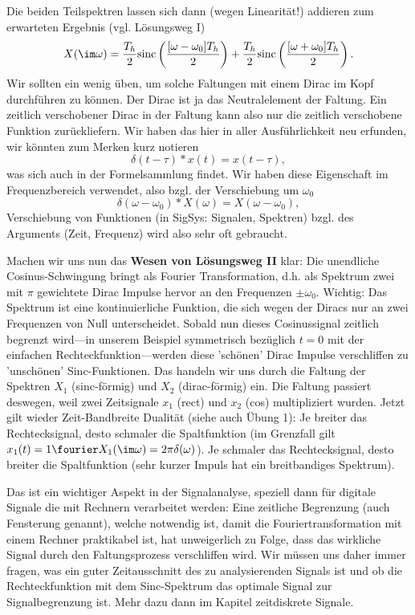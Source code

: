 \begin{ExCalc}
Die beiden Teilspektren lassen sich dann (wegen Linearität!) addieren zum erwarteten
Ergebnis (vgl. Lösungsweg I)
\begin{equation}
  X(\im\omega) =
  \frac{T_h}{2}\mathrm{sinc}\left(\frac{[\omega-\omega_0] T_h}{2}\right) +
  \frac{T_h}{2}\mathrm{sinc}\left(\frac{[\omega+\omega_0] T_h}{2}\right).
\end{equation}
Wir sollten ein wenig üben, um solche Faltungen mit einem Dirac
im Kopf durchführen zu können. Der Dirac ist ja das Neutralelement der Faltung.
Ein zeitlich verschobener Dirac in der Faltung kann also
nur die zeitlich verschobene Funktion zurückliefern.
Wir haben das hier in aller Ausführlichkeit neu erfunden, wir könnten zum Merken
kurz notieren
\begin{equation}
  \delta(t-\tau) \ast x(t) = x(t-\tau),
\end{equation}
was sich auch in der Formelsammlung findet. Wir haben diese Eigenschaft im
Frequenzbereich verwendet, also bzgl. der Verschiebung um $\omega_0$
\begin{equation}
  \delta(\omega-\omega_0) \ast X(\omega) = X(\omega-\omega_0),
\end{equation}
Verschiebung von Funktionen (in SigSys: Signalen, Spektren) bzgl. des Arguments
(Zeit, Frequenz) wird also sehr oft gebraucht.

Machen wir uns nun das \textbf{Wesen von Lösungsweg II} klar: Die unendliche
Cosinus-Schwingung bringt als Fourier Transformation, d.h. als Spektrum zwei
mit $\pi$ gewichtete Dirac Impulse hervor an den Frequenzen $\pm\omega_0$.
Wichtig: Das Spektrum ist eine kontinuierliche Funktion, die sich wegen der
Diracs nur an zwei Frequenzen von Null unterscheidet.
Sobald nun dieses Cosinussignal zeitlich begrenzt wird---in unserem Beispiel
symmetrisch bezüglich $t=0$ mit der einfachen Rechteckfunktion---werden diese
'schönen' Dirac Impulse verschliffen zu 'unschönen' Sinc-Funktionen. Das handeln
wir uns durch die Faltung der Spektren $X_1$ (sinc-förmig) und $X_2$ (dirac-förmig)
ein. Die Faltung passiert deswegen, weil zwei Zeitsignale $x_1$ (rect) und $x_2$ (cos)
multipliziert wurden.
Jetzt gilt wieder Zeit-Bandbreite Dualität (siehe auch Übung 1):
Je breiter das Rechtecksignal, desto schmaler die Spaltfunktion
(im Grenzfall gilt $x_1(t)=1\fourier X_1(\im\omega) = 2\pi\delta(\omega)$).
Je schmaler das Rechtecksignal, desto breiter die Spaltfunktion (sehr kurzer Impuls
hat ein breitbandiges Spektrum).

Das ist ein wichtiger Aspekt in der Signalanalyse, speziell dann für
digitale Signale die mit Rechnern verarbeitet werden: Eine zeitliche Begrenzung
(auch Fensterung genannt),
welche notwendig ist, damit die Fouriertransformation mit einem Rechner
praktikabel ist,
hat unweigerlich zu Folge, dass das wirkliche Signal durch den Faltungsprozess
verschliffen wird. Wir müssen uns daher immer fragen, was ein guter Zeitausschnitt
des zu analysierenden Signals ist und ob die Rechteckfunktion mit dem
Sinc-Spektrum das optimale Signal zur Signalbegrenzung ist. Mehr dazu dann im Kapitel
zeitdiskrete Signale.
\end{ExCalc}


